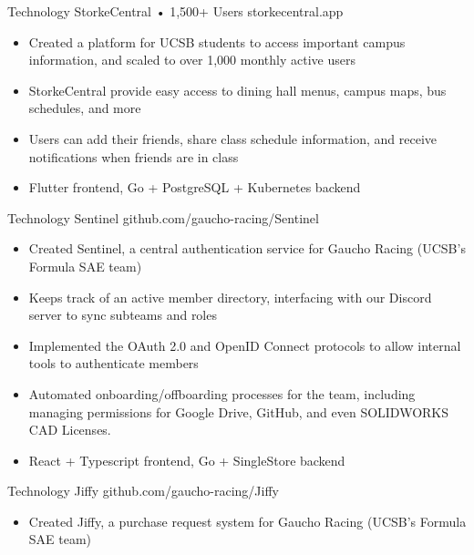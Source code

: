 \documentclass[9pt]{developercv} %
\begin{document}
\begin{entrylist}
    \entry
		{Technology}
		{StorkeCentral • 1,500+ Users}
		{storkecentral.app}
        {\vspace{-8pt}
        \begin{itemize}[noitemsep,topsep=0pt,parsep=0pt,partopsep=0pt, leftmargin=10pt]
            \item Created a platform for UCSB students to access important campus information, and scaled to over 1,000 monthly active users
            \item StorkeCentral provide easy access to dining hall menus, campus maps, bus schedules, and more
            \item Users can add their friends, share class schedule information, and receive notifications when friends are in class
            \item Flutter frontend, Go + PostgreSQL + Kubernetes backend
        \end{itemize}}
	\entry
		{Technology}
		{Sentinel}
		{github.com/gaucho-racing/Sentinel}
		{\vspace{-8pt}
        \begin{itemize}[noitemsep,topsep=0pt,parsep=0pt,partopsep=0pt, leftmargin=10pt]
            \item Created Sentinel, a central authentication service for Gaucho Racing (UCSB's Formula SAE team)
            \item Keeps track of an active member directory, interfacing with our Discord server to sync subteams and roles
            \item Implemented the OAuth 2.0 and OpenID Connect protocols to allow internal tools to authenticate members
            \item Automated onboarding/offboarding processes for the team, including managing permissions for Google Drive, GitHub, and even SOLIDWORKS CAD Licenses.
            \item React + Typescript frontend, Go + SingleStore backend
        \end{itemize}}
    \entry
		{Technology}
		{Jiffy}
		{github.com/gaucho-racing/Jiffy}
		{\vspace{-8pt}
        \begin{itemize}[noitemsep,topsep=0pt,parsep=0pt,partopsep=0pt, leftmargin=10pt]
            \item Created Jiffy, a purchase request system for Gaucho Racing (UCSB's Formula SAE team)

\end{itemize}}
\end{entrylist}
\end{document}
